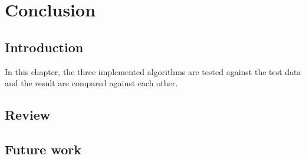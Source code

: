 
\chapter{Conclusion} %

\label{Chapter6} %



\section{Introduction}

In this chapter, the three implemented algorithms are tested against the test data and the result are compared against each other.

\section{Review}
\section{Future work}

